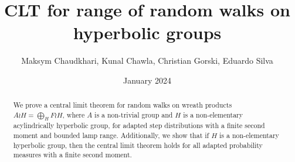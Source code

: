 \documentclass{amsart}
\title{CLT for range of random walks on hyperbolic groups}
\author{Maksym Chaudkhari, Kunal Chawla, Christian Gorski, Eduardo Silva }
\date{January 2024}
\begin{document}
	\begin{abstract} 
We prove a central limit theorem for random walks on wreath products $A\wr H=\bigoplus_H F\wr H $, where $A$ is a non-trivial group and $H$ is a non-elementary acylindrically hyperbolic group, for adapted step distributions with a finite second moment and bounded lamp range. Additionally, we show that if $H$ is a non-elementary hyperbolic group, then the central limit theorem holds for all adapted probability measures with a finite second moment.
	\end{abstract}
\maketitle










\end{document}
